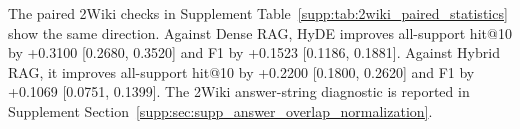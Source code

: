 The paired 2Wiki checks in Supplement Table~\ref{supp:tab:2wiki_paired_statistics} show the same direction. Against Dense RAG, HyDE improves all-support hit@10 by +0.3100 [0.2680, 0.3520] and F1 by +0.1523 [0.1186, 0.1881]. Against Hybrid RAG, it improves all-support hit@10 by +0.2200 [0.1800, 0.2620] and F1 by +0.1069 [0.0751, 0.1399]. The 2Wiki answer-string diagnostic is reported in Supplement Section~\ref{supp:sec:supp_answer_overlap_normalization}.
